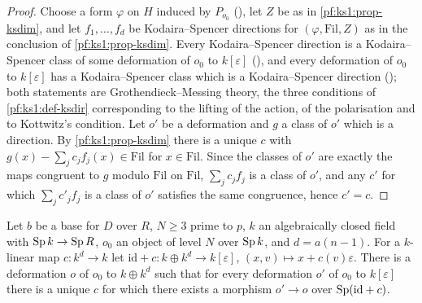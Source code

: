 \begin{proof}
Choose a form $\varphi$ on $H$ induced by $P_{o_0}$ (), let $Z$ be as in
\cref{pf:ks1:prop-ksdim}, and let $f_1,\dots,f_d$ be Kodaira--Spencer directions for $(\varphi,\mathrm{Fil},Z)$ as in the conclusion of
\cref{pf:ks1:prop-ksdim}. Every Kodaira--Spencer direction is a Kodaira--Spencer class of some deformation of $o_0$ to $k[\varepsilon]$
(), and every deformation of $o_0$ to $k[\varepsilon]$ has a Kodaira--Spencer
class which is a Kodaira--Spencer direction (); both statements
are Grothendieck--Messing theory, the three conditions of \cref{pf:ks1:def-ksdir} corresponding to the lifting of the action, of the polarisation
and to Kottwitz's condition. Let $o'$ be a deformation and $g$ a class of $o'$ which is a direction. By \cref{pf:ks1:prop-ksdim} there is a unique $c$
with $g(x)-\sum_jc_jf_j(x)\in\mathrm{Fil}$ for $x\in\mathrm{Fil}$. Since the classes of $o'$ are exactly the maps congruent to $g$ modulo $\mathrm{Fil}$
on $\mathrm{Fil}$, $\sum_jc_jf_j$ is a class of $o'$, and any $c'$ for which $\sum_jc'_jf_j$ is a class of $o'$ satisfies the same congruence, hence
$c'=c$.
\end{proof}

\begin{lemma}\label{pf:ks1:lem-univdef}
Let $b$ be a base for $D$ over $R$, $N\ge3$ prime to $p$, $k$ an algebraically closed field with $\operatorname{Sp} k\to\operatorname{Sp} R$, $o_0$ an object of level
$N$ over $\operatorname{Sp} k$, and $d=a(n-1)$. For a $k$-linear map $c:k^d\to k$ let $\mathrm{id}+c:k\oplus k^d\to k[\varepsilon]$, $(x,v)\mapsto
x+c(v)\varepsilon$. There is a deformation $o$ of $o_0$ to $k\oplus k^d$ such that for every deformation $o'$ of $o_0$ to $k[\varepsilon]$ there is a
unique $c$ for which there exists a morphism $o'\to o$ over $\operatorname{Sp}(\mathrm{id}+c)$.
\end{lemma}

